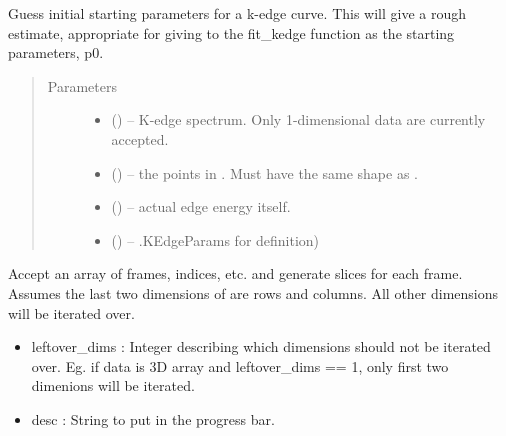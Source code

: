 \documentclass[letterpaper,10pt,english]{sphinxmanual}
\begin{document}
\begin{fulllineitems}
\label{\detokenize{xanespy:xanespy.xanes_math.guess_kedge}}
Guess initial starting parameters for a k-edge curve. This will
give a rough estimate, appropriate for giving to the fit\_kedge
function as the starting parameters, p0.
\begin{quote}\begin{description}
\item[{Parameters}] \leavevmode\begin{itemize}
\item {} 
 (\sphinxstyleliteralemphasis{-}) -- K-edge spectrum. Only 1-dimensional data are currently accepted.

\item {} 
 (\sphinxstyleliteralemphasis{-}) -- the points in . Must have the same shape as .

\item {} 
 (\sphinxstyleliteralemphasis{-}) -- actual edge energy itself.

\item {} 
 (\sphinxstyleliteralemphasis{ (}) -- .KEdgeParams for definition)

\end{itemize}

\end{description}\end{quote}

\end{fulllineitems}


\begin{fulllineitems}
\label{\detokenize{xanespy:xanespy.xanes_math.iter_indices}}
Accept an array of frames, indices, etc. and generate slices for
each frame. Assumes the last two dimensions of  are rows and
columns. All other dimensions will be iterated over.
\begin{itemize}
\item {} 
leftover\_dims : Integer describing which dimensions should not
be iterated over. Eg. if data is 3D array and leftover\_dims == 1,
only first two dimenions will be iterated.

\item {} 
desc : String to put in the progress bar.

\end{itemize}

\end{fulllineitems}
\end{document}
